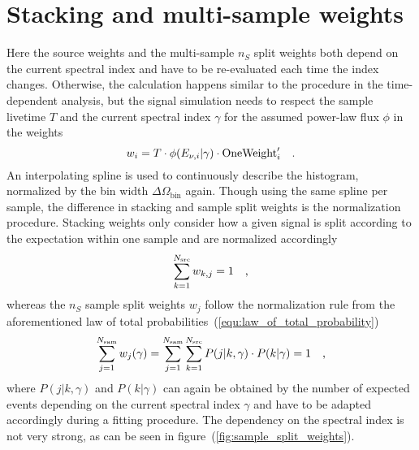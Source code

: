 \section{Stacking and multi-sample weights}
Here the source weights and the multi-sample $n_S$ split weights both depend on the current spectral index and have to be re-evaluated each time the index changes.
Otherwise, the calculation happens similar to the procedure in the time-dependent analysis, but the signal simulation needs to respect the sample livetime $T$ and the current spectral index $\gamma$ for the assumed power-law flux $\phi$ in the weights
\begin{equation}
  w_i = T\cdot \phi(E_{\nu,i}|\gamma)\cdot\text{OneWeight}'_i
  \quad\text{.}
\end{equation}
An interpolating spline is used to continuously describe the histogram, normalized by the bin width $\Delta\Omega_\text{bin}$ again.
Though using the same spline per sample, the difference in stacking and sample split weights is the normalization procedure.
Stacking weights only consider how a given signal is split according to the expectation within one sample and are normalized accordingly
\begin{equation}
  \sum_{k=1}^{N_\text{src}} w_{k,j} = 1
  \quad\text{,}
\end{equation}
whereas the $n_S$ sample split weights $w_j$ follow the normalization rule from the aforementioned law of total probabilities~(\ref{equ:law_of_total_probability})
\begin{equation}
  \sum_{j=1}^{N_\text{sam}} w_j(\gamma)
  = \sum_{j=1}^{N_\text{sam}} \sum_{k=1}^{N_\text{src}}
      P(j|k,\gamma)\cdot P(k|\gamma) = 1
  \quad\text{,}
\end{equation}
where $P(j|k,\gamma)$ and $P(k|\gamma)$ can again be obtained by the number of expected events depending on the current spectral index $\gamma$ and have to be adapted accordingly during a fitting procedure.
The dependency on the spectral index is not very strong, as can be seen in figure~(\ref{fig:sample_split_weights}).


